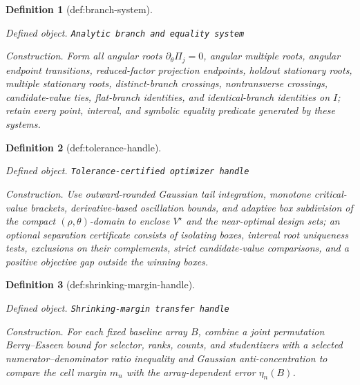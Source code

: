 \documentclass{article}
\newtheorem{definition}{Definition}
\begin{document}
\begin{definition}[def:branch-system]\label{def:branch-system}
\par\smallskip\noindent\emph{Defined object.} \texttt{Analytic branch and equality system}
\par\smallskip\noindent\emph{Construction.} Form all angular roots \(\partial_{\theta}\Pi_j=0\), angular multiple roots, angular endpoint transitions, reduced-factor projection endpoints, holdout stationary roots, multiple stationary roots, distinct-branch crossings, nontransverse crossings, candidate-value ties, flat-branch identities, and identical-branch identities on \(I\); retain every point, interval, and symbolic equality predicate generated by these systems.
\end{definition}

\begin{definition}[def:tolerance-handle]\label{def:tolerance-handle}
\par\smallskip\noindent\emph{Defined object.} \texttt{Tolerance-\allowbreak{}certified optimizer handle}
\par\smallskip\noindent\emph{Construction.} Use outward-rounded Gaussian tail integration, monotone critical-value brackets, derivative-based oscillation bounds, and adaptive box subdivision of the compact \((\rho,\theta)\)-domain to enclose \(V^{\star}\) and the near-optimal design sets; an optional separation certificate consists of isolating boxes, interval root uniqueness tests, exclusions on their complements, strict candidate-value comparisons, and a positive objective gap outside the winning boxes.
\end{definition}

\begin{definition}[def:shrinking-margin-handle]\label{def:shrinking-margin-handle}
\par\smallskip\noindent\emph{Defined object.} \texttt{Shrinking-\allowbreak{}margin transfer handle}
\par\smallskip\noindent\emph{Construction.} For each fixed baseline array \(B\), combine a joint permutation Berry--Esseen bound for selector, ranks, counts, and studentizers with a selected numerator--denominator ratio inequality and Gaussian anti-concentration to compare the cell margin \(m_n\) with the array-dependent error \(\eta_n(B)\).
\end{definition}
\end{document}
